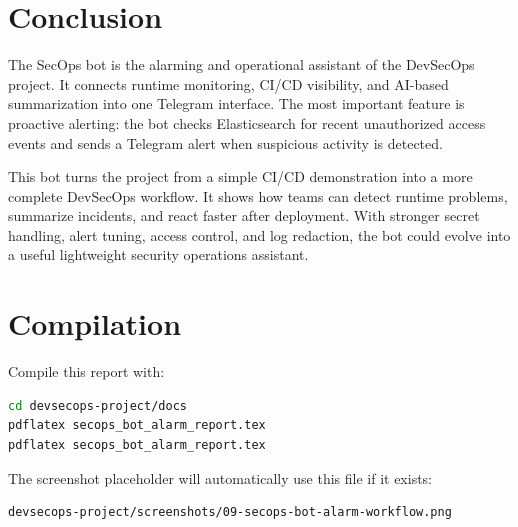 \documentclass[12pt,a4paper]{report}
\begin{document}
\chapter{Conclusion}

The SecOps bot is the alarming and operational assistant of the DevSecOps project. It connects runtime monitoring, CI/CD visibility, and AI-based summarization into one Telegram interface. The most important feature is proactive alerting: the bot checks Elasticsearch for recent unauthorized access events and sends a Telegram alert when suspicious activity is detected.

This bot turns the project from a simple CI/CD demonstration into a more complete DevSecOps workflow. It shows how teams can detect runtime problems, summarize incidents, and react faster after deployment. With stronger secret handling, alert tuning, access control, and log redaction, the bot could evolve into a useful lightweight security operations assistant.

\appendix

\chapter{Compilation}

Compile this report with:

\begin{lstlisting}[language=bash,caption={Compile the bot report}]
cd devsecops-project/docs
pdflatex secops_bot_alarm_report.tex
pdflatex secops_bot_alarm_report.tex
\end{lstlisting}

The screenshot placeholder will automatically use this file if it exists:

\begin{lstlisting}[language=bash,caption={Expected bot workflow screenshot}]
devsecops-project/screenshots/09-secops-bot-alarm-workflow.png
\end{lstlisting}
\end{document}
